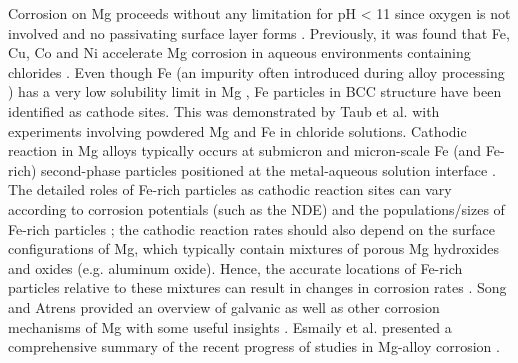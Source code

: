 Corrosion on Mg proceeds without any limitation for pH < 11 since oxygen is not involved and no passivating surface layer forms \cite{liu2016controlling,ralston2012effect}. Previously, it was found that Fe, Cu, Co and Ni accelerate Mg corrosion in aqueous environments containing chlorides \cite{hanawalt1942corrosion, mcnulty1942some}. Even though Fe (an impurity often introduced during alloy processing \cite{yang2015corrosion, scharf2007iron}) has a very low solubility limit in Mg \cite{mcnulty1942some}, Fe particles in \ac{BCC} structure have been identified as cathode sites. This was demonstrated by Taub et al. \cite{taub2002mechanism} with experiments involving powdered Mg and Fe in chloride solutions. Cathodic reaction in Mg alloys typically occurs at submicron and micron-scale Fe (and Fe-rich) second-phase particles positioned at the metal-aqueous solution interface \cite{yang2015corrosion, eaves2012inhibition}. The detailed roles of Fe-rich particles as cathodic reaction sites can vary according to corrosion potentials (such as the \ac{NDE}) and the populations/sizes of Fe-rich particles \cite{hoche2016effect, yang2018effect}; the cathodic reaction rates should also depend on the surface configurations of Mg, which typically contain mixtures of porous Mg hydroxides and oxides (e.g. aluminum oxide). Hence, the accurate locations of Fe-rich particles relative to these mixtures can result in changes in corrosion rates \cite{taheri2012analysis, taheri2014towards}. Song and Atrens provided an overview of galvanic as well as other corrosion mechanisms of Mg with some useful insights \cite{song2003understanding}. Esmaily et al. presented a comprehensive summary of the recent progress of studies in Mg-alloy corrosion \cite{esmaily2017fundamentals}.


